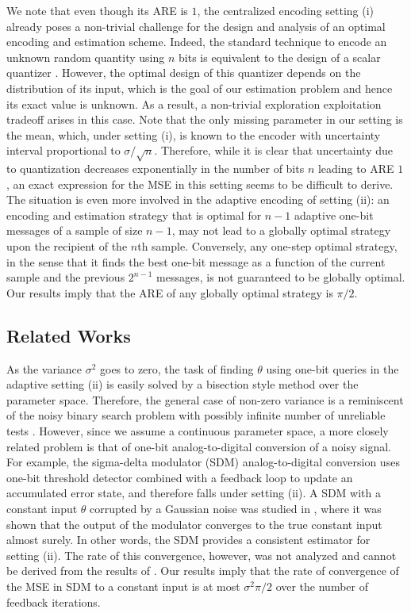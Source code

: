 \documentclass[letterpaper, conference,9pt]{IEEEtran}      %
\begin{document}
We note that even though its ARE is $1$, the centralized encoding setting (i) already poses a non-trivial challenge for the design and analysis of an optimal encoding and estimation scheme. Indeed, the standard technique to encode an unknown random quantity using $n$ bits is equivalent to the design of a scalar quantizer \cite{gray1998quantization}. However, the optimal design of this quantizer depends on the distribution of its input, which is the goal of our estimation problem and hence its exact value is unknown. As a result, a non-trivial exploration exploitation tradeoff arises in this case. Note that the only missing parameter in our setting is the mean, which, under setting (i), is known to the encoder with uncertainty interval proportional to $\sigma/\sqrt{n}$. Therefore, while it is clear that uncertainty due to quantization decreases exponentially in the number of bits $n$ leading to ARE $1$, an exact expression for the MSE in this setting seems to be difficult to derive. The situation is even more involved in the adaptive encoding of setting (ii): an encoding and estimation strategy that is optimal for $n-1$ adaptive one-bit messages of a sample of size $n-1$, may not lead to a globally optimal strategy upon the recipient of the $n$th sample. Conversely, any one-step optimal strategy, in the sense that it finds the best one-bit message as a function of the current sample and the previous $2^{n-1}$ messages, is not guaranteed to be globally optimal. Our results imply that the ARE of any globally optimal strategy is $\pi/2$. 

\subsection*{Related Works}

As the variance $\sigma^2$ goes to zero, the task of finding $\theta$ using one-bit queries in the adaptive setting (ii) is easily solved by a bisection style method over the parameter space. Therefore, the general case of non-zero variance is a reminiscent of the noisy binary search problem with possibly infinite number of unreliable tests \cite{cicalese2002least, Karp:2007:NBS:1283383.1283478}. However, since we assume a continuous parameter space, a more closely related problem is that of one-bit analog-to-digital conversion of a noisy signal. For example, the sigma-delta modulator (SDM) analog-to-digital conversion \cite{1092194} uses one-bit threshold detector combined with a feedback loop to update an accumulated error state, and therefore falls under setting (ii). A SDM with a constant input $\theta$ corrupted by a Gaussian noise was studied in \cite{53738}, where it was shown that the output of the modulator converges to the true constant input almost surely. In other words, the SDM provides a consistent estimator for setting (ii). The rate of this convergence, however, was not analyzed and cannot be derived from the results of \cite{53738}. Our results imply that the rate of convergence of the MSE in SDM to a constant input is at most $\sigma^2\pi/2$ over the number of feedback iterations. \\
\end{document}
